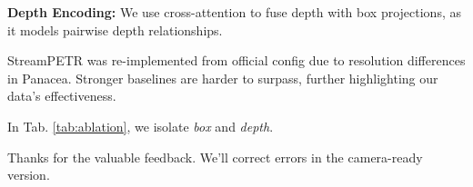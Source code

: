 \noindent \textbf{Depth Encoding:} We use cross-attention to fuse depth with box projections, as it models 
pairwise depth relationships.















StreamPETR was re-implemented from official config due to resolution differences in Panacea. Stronger baselines are harder to surpass, further highlighting our data’s effectiveness.


In Tab. \ref{tab:ablation}, we isolate \textit{box} and \textit{depth}.


\vspace{-0.8em}
\begin{table}[htbp]
    \centering
    \footnotesize
        \centering
        \captionsetup{skip=2pt}
        \caption{SGA ablation: isolate \textit{box projection} / \textit{depth injection}.}
        \label{tab:ablation}
        \vspace{-1.5em}
\end{table}









\vspace{-0.3em}
Thanks for the valuable feedback. We'll correct errors in the camera-ready version.






%     
%     




